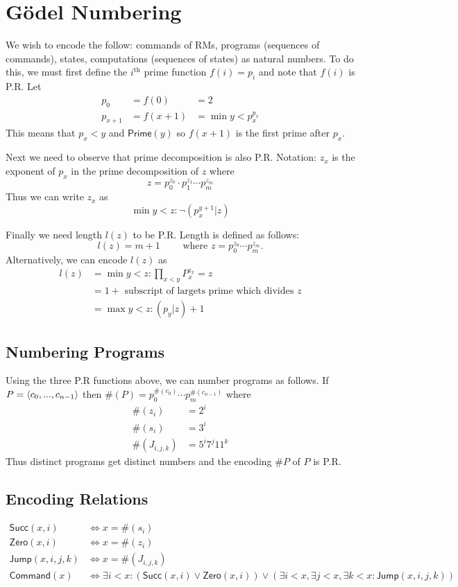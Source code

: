 \documentclass[twoside]{article}
\def\Succ{\mathsf{Succ}}
\def\Zero{\mathsf{Zero}}
\def\Jump{\mathsf{Jump}}
\def\Command{\mathsf{Command}}
\DeclarePairedDelimiter\anglebrac{\langle}{\rangle}
\begin{document}
\section{G\"{o}del Numbering}
We wish to encode the follow: commands of RMs, programs (sequences of commands), states, computations (sequences of states) as natural numbers. To do this, we must first define the $i^{\mbox{th}}$ prime function $f(i) = p_i$ and note that $f(i)$ is P.R. Let
\begin{align*}
p_0 &= f(0) &= 2 \\
p_{x+1} &= f(x+1) &= \min y < p_x^{p_x}
\end{align*}
This means that $p_x < y$ and $\mathsf{Prime}(y)$ so $f(x+1)$ is the first prime after $p_x$.

Next we need to observe that prime decomposition is also P.R. Notation: $z_x$ is the exponent of $p_x$ in the prime decomposition of $z$ where
\[z = p_0^{z_0} \cdot p_1^{z_1} \cdots p_m^{z_m}\]
Thus we can write $z_x$ as
\[\min y < z: \lnot (p_x^{y+1}| z)\]

Finally we need length $l(z)$ to be P.R. Length is defined as follows:
\[l(z) = m + 1 \qquad \mbox{ where } z = p_0^{z_0} \cdots p_m^{z_m}.\]
Alternatively, we can encode $l(z)$ as
\begin{align*}
l(z) &= \min y < z : \prod_{x < y} P_x^{z_x} = z\\
&= 1 + \mbox{ subscript of largets prime which divides $z$}\\
&= \max y < z: (p_y | z) + 1
\end{align*}

\subsection{Numbering Programs}
Using the three P.R functions above, we can number programs as follows. If $P = \anglebrac{c_0, ..., c_{n-1}}$ then $\#(P) = p_0^{\#(c_0)} \cdots p_m^{\#(c_{n-1})}$ where 
\begin{align*}
\#(z_i) &= 2^i \\
\#(s_i) &= 3^i \\
\#(J_{i,j,k}) &= 5^i 7^j 11^k
\end{align*}
Thus distinct programs get distinct numbers and the encoding $\# P$ of $P$ is P.R.

\subsection{Encoding Relations}
\begin{align*}
\Succ(x,i) &\iff x = \#(s_i)\\
\Zero(x,i) &\iff x = \#(z_i)\\
\Jump(x,i,j,k) &\iff x = \#(J_{i,j,k})\\
\Command(x) &\iff \exists i < x: (\Succ(x, i) \lor \Zero(x,i)) \lor (\exists i < x, \exists j < x, \exists k < x: \Jump(x,i,j,k))
\end{align*}
\end{document}
